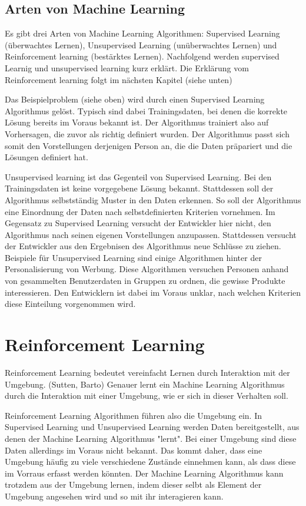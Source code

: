 \subsection*{Arten von Machine Learning}

Es gibt drei Arten von Machine Learning Algorithmen: Supervised Learning (überwachtes Lernen), Unsupervised Learning (unüberwachtes Lernen) und
Reinforcement learning (bestärktes Lernen). Nachfolgend werden supervised Learnig und unsupervised learning
kurz erklärt. Die Erklärung vom Reinforcement learning folgt im nächsten Kapitel (siehe unten)

Das Beispielproblem (siehe oben) wird durch einen Supervised Learning
Algorithmus gelöst. Typisch sind dabei Trainingsdaten, bei denen die korrekte
Lösung bereits im Voraus bekannt ist. Der Algorithmus trainiert also auf
Vorhersagen, die zuvor als richtig definiert wurden. Der Algorithmus passt sich
somit den Vorstellungen derjenigen Person an, die die Daten präpariert und die
Lösungen definiert hat.


Unsupervised learning ist das Gegenteil von Supervised Learning. Bei den
Trainingsdaten ist keine vorgegebene Lösung bekannt. Stattdessen soll der
Algorithmus selbstständig Muster in den Daten erkennen. So soll der Algorithmus
eine Einordnung der Daten nach selbstdefinierten Kriterien vornehmen. Im
Gegensatz zu Supervised Learning versucht der Entwickler hier nicht, den
Algorithmus nach seinen eigenen Vorstellungen anzupassen. Stattdessen versucht
der Entwickler aus den Ergebnisen des Algorithmus neue Schlüsse zu ziehen.
Beispiele für Unsupervised Learning sind einige Algorithmen hinter der
Personalisierung von Werbung. Diese Algorithmen versuchen Personen anhand von
gesammelten Benutzerdaten in Gruppen zu ordnen, die gewisse Produkte
interessieren. Den Entwicklern ist dabei im Voraus unklar, nach welchen
Kriterien diese Einteilung vorgenommen wird. 

\section{Reinforcement Learning}
\label{chap:t_rl}
Reinforcement Learning bedeutet vereinfacht Lernen durch Interaktion mit der
Umgebung. (Sutten, Barto)  Genauer lernt ein Machine Learning Algorithmus durch
die Interaktion mit einer Umgebung, wie er sich in dieser Verhalten soll.

Reinforcement Learning Algorithmen führen also die Umgebung ein. In Supervised
Learning und Unsupervised Learning werden Daten bereitgestellt, aus denen der
Machine Learning Algorithmus "lernt". Bei einer Umgebung sind diese Daten
allerdings im Voraus nicht bekannt. Das kommt daher, dass eine Umgebung häufig
zu viele verschiedene Zustände einnehmen kann, als dass diese im Vorraus erfasst
werden könnten. Der Machine Learning Algorithmus kann trotzdem aus der Umgebung
lernen, indem dieser selbt als Element der Umgebung angesehen wird und so mit
ihr interagieren kann.

